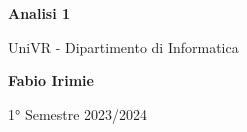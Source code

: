 \begin{titlepage}
	\begin{center}
		\vspace*{1cm}

		\Huge
		\textbf{Analisi 1}

		\vspace{0.5cm}
		\LARGE
		UniVR - Dipartimento di Informatica

		\vspace{1.5cm}

		\textbf{Fabio Irimie}

		\vfill


		\vspace{0.8cm}


		1° Semestre 2023/2024

	\end{center}
\end{titlepage}
